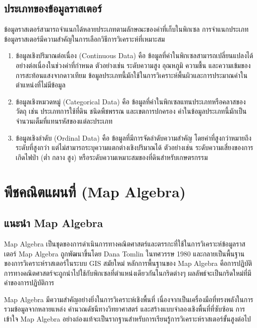 \subsection{ประเภทของข้อมูลราสเตอร์}
ข้อมูลราสเตอร์สามารถจำแนกได้หลายประเภทตามลักษณะของค่าที่เก็บในพิกเซล การจำแนกประเภทข้อมูลราสเตอร์มีความสำคัญในการเลือกวิธีการวิเคราะห์ที่เหมาะสม

\begin{enumerate}
    \item ข้อมูลเชิงปริมาณต่อเนื่อง (Continuous Data) คือ ข้อมูลที่ค่าในพิกเซลสามารถเปลี่ยนแปลงได้อย่างต่อเนื่องในช่วงค่าที่กำหนด ตัวอย่างเช่น ระดับความสูง อุณหภูมิ ความชื้น และความเข้มของการสะท้อนแสงจากดาวเทียม ข้อมูลประเภทนี้มักใช้ในการวิเคราะห์พื้นผิวและการประมาณค่าในตำแหน่งที่ไม่มีข้อมูล

    \item ข้อมูลเชิงหมวดหมู่ (Categorical Data) คือ ข้อมูลที่ค่าในพิกเซลแทนประเภทหรือคลาสของวัตถุ เช่น ประเภทการใช้ที่ดิน ชนิดพืชพรรณ และเขตการปกครอง ค่าในข้อมูลประเภทนี้มักเป็นจำนวนเต็มที่แทนรหัสของแต่ละประเภท

    \item ข้อมูลเชิงลำดับ (Ordinal Data) คือ ข้อมูลที่มีการจัดลำดับความสำคัญ โดยค่าที่สูงกว่าหมายถึงระดับที่สูงกว่า แต่ไม่สามารถระบุความแตกต่างเชิงปริมาณได้ ตัวอย่างเช่น ระดับความเสี่ยงของการเกิดไฟป่า (ต่ำ กลาง สูง) หรือระดับความเหมาะสมของที่ดินสำหรับเกษตรกรรม
\end{enumerate}

\section{พีชคณิตแผนที่ (Map Algebra)}

\subsection{แนะนำ Map Algebra}
Map Algebra เป็นชุดของการดำเนินการทางคณิตศาสตร์และตรรกะที่ใช้ในการวิเคราะห์ข้อมูลราสเตอร์ Map Algebra ถูกพัฒนาขึ้นโดย Dana Tomlin ในทศวรรษ 1980 และกลายเป็นพื้นฐานของการวิเคราะห์ราสเตอร์ในระบบ GIS สมัยใหม่ หลักการพื้นฐานของ Map Algebra คือการปฏิบัติการทางคณิตศาสตร์จะถูกนำไปใช้กับพิกเซลที่ตำแหน่งเดียวกันในกริดต่างๆ ผลลัพธ์จะเป็นกริดใหม่ที่มีค่าของการปฏิบัติการ

Map Algebra มีความสำคัญอย่างยิ่งในการวิเคราะห์เชิงพื้นที่ เนื่องจากเป็นเครื่องมือที่ทรงพลังในการรวมข้อมูลจากหลายแหล่ง คำนวณดัชนีทางวิทยาศาสตร์ และสร้างแบบจำลองเชิงพื้นที่ที่ซับซ้อน การเข้าใจ Map Algebra อย่างถ่องแท้จะเป็นรากฐานสำหรับการเรียนรู้การวิเคราะห์ราสเตอร์ขั้นสูงต่อไป


